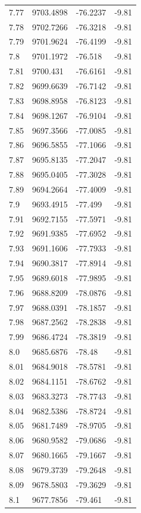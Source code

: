 \begin{table}[H]
\begin{tabular}{llll}
7.77 & 9703.4898 & -76.2237 & -9.81 \\
7.78 & 9702.7266 & -76.3218 & -9.81 \\
7.79 & 9701.9624 & -76.4199 & -9.81 \\
7.8 & 9701.1972 & -76.518 & -9.81 \\
7.81 & 9700.431 & -76.6161 & -9.81 \\
7.82 & 9699.6639 & -76.7142 & -9.81 \\
7.83 & 9698.8958 & -76.8123 & -9.81 \\
7.84 & 9698.1267 & -76.9104 & -9.81 \\
7.85 & 9697.3566 & -77.0085 & -9.81 \\
7.86 & 9696.5855 & -77.1066 & -9.81 \\
7.87 & 9695.8135 & -77.2047 & -9.81 \\
7.88 & 9695.0405 & -77.3028 & -9.81 \\
7.89 & 9694.2664 & -77.4009 & -9.81 \\
7.9 & 9693.4915 & -77.499 & -9.81 \\
7.91 & 9692.7155 & -77.5971 & -9.81 \\
7.92 & 9691.9385 & -77.6952 & -9.81 \\
7.93 & 9691.1606 & -77.7933 & -9.81 \\
7.94 & 9690.3817 & -77.8914 & -9.81 \\
7.95 & 9689.6018 & -77.9895 & -9.81 \\
7.96 & 9688.8209 & -78.0876 & -9.81 \\
7.97 & 9688.0391 & -78.1857 & -9.81 \\
7.98 & 9687.2562 & -78.2838 & -9.81 \\
7.99 & 9686.4724 & -78.3819 & -9.81 \\
8.0 & 9685.6876 & -78.48 & -9.81 \\
8.01 & 9684.9018 & -78.5781 & -9.81 \\
8.02 & 9684.1151 & -78.6762 & -9.81 \\
8.03 & 9683.3273 & -78.7743 & -9.81 \\
8.04 & 9682.5386 & -78.8724 & -9.81 \\
8.05 & 9681.7489 & -78.9705 & -9.81 \\
8.06 & 9680.9582 & -79.0686 & -9.81 \\
8.07 & 9680.1665 & -79.1667 & -9.81 \\
8.08 & 9679.3739 & -79.2648 & -9.81 \\
8.09 & 9678.5803 & -79.3629 & -9.81 \\
8.1 & 9677.7856 & -79.461 & -9.81 \\

\end{tabular}
\end{table}
